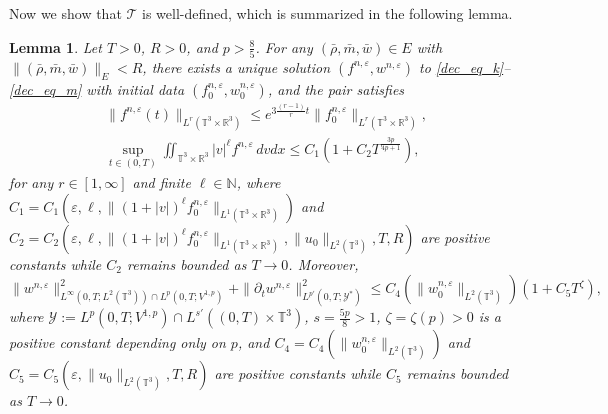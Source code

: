 \documentclass[10pt,reqno]{amsart}
\numberwithin{equation}{section}
\newtheorem{lemma}{Lemma}[section]
\newcommand{\R}{\mathbb R}
\newcommand{\N}{\mathbb N}
\newcommand{\T}{\mathbb T}
\newcommand{\e}{\varepsilon}
\newcommand{\pa}{\partial}
\newcommand{\inttr}{\iint_{\T^3 \times \R^3}}
\begin{document}
Now we show that $\mathcal{T}$ is well-defined, which is summarized in the following lemma.
\begin{lemma}\label{dec_bdd}
Let $T > 0$, $R>0$, and $p > \frac85$. For any $(\bar\rho, \bar m, \bar w) \in E$ with $\|(\bar \rho, \bar m, \bar w)\|_{E} <R$, there exists a unique solution $(f^{n,\e}, w^{n,\e})$ to \eqref{dec_eq_k}--\eqref{dec_eq_m} with initial data $(f_0^{n,\e}, w_0^{n,\e})$, and the pair satisfies
\[\begin{aligned}
&\|f^{n,\e}(t)\|_{L^r(\T^3 \times \R^3)} \le e^{3\frac{(r-1)}{r} t} \|f_0^{n,\e}\|_{L^r(\T^3 \times \R^3)} ,\\
&\sup_{t \in (0,T)} \inttr |v|^\ell f^{n,\e}\,dvdx \le  C_1 (1+ C_2 T^{\frac{3p}{4p+1}}), 
\end{aligned}\]
for any $r \in [1, \infty]$ and finite $\ell \in \N$,  where $C_1= C_1(\e, \ell, \|(1+|v|)^\ell f_0^{n,\e}\|_{L^1(\T^3\times\R^3)})$ and $C_2 = C_2(\e, \ell, \|(1+|v|)^\ell f_0^{n,\e}\|_{L^1(\T^3\times\R^3)}, \|u_0\|_{L^2(\T^3)}, T, R)$ are positive constants while $C_2$ remains bounded as $T \to 0$. Moreover,
\[
\|w^{n,\e}\|_{L^\infty(0,T;L^2(\T^3))\cap L^p(0,T;V^{1,p})}^2 +  \|\pa_t w^{n,\e}\|_{L^{p'}(0,T;\mathcal{Y}^*)}^2  \le C_4(\|w_0^{n,\e}\|_{L^2(\T^3)})(1+ C_5 T^\zeta),
\]
where $\mathcal{Y} := L^p(0,T;V^{1,p})\cap L^{s'}((0,T)\times\T^3)$, $s= \frac{5p}{8}>1$, $\zeta=\zeta(p)>0$ is a positive constant depending only on $p$, and $C_4 = C_4(\|w_0^{n,\e}\|_{L^2(\T^3)})$ and $C_5 = C_5(\e, \|u_0\|_{L^2(\T^3)}, T, R)$ are positive constants while $C_5$ remains bounded as $T\to 0$.
\end{lemma}
\end{document}
